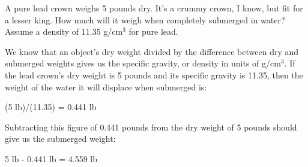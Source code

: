 

A pure lead crown weighs 5 pounds dry.  It's a crummy crown, I know, but fit for a lesser king.  How much will it weigh when completely submerged in water?  Assume a density of 11.35 g/cm$^{3}$ for pure lead.







We know that an object's dry weight divided by the difference between dry and submerged weights gives us the specific gravity, or density in units of g/cm$^{3}$.  If the lead crown's dry weight is 5 pounds and its specific gravity is 11.35, then the weight of the water it will displace when submerged is:

\vskip 10pt

(5 lb)/(11.35) = 0.441 lb

\vskip 10pt

Subtracting this figure of 0.441 pounds from the dry weight of 5 pounds should give us the submerged weight:

\vskip 10pt

5 lb - 0.441 lb = 4.559 lb











